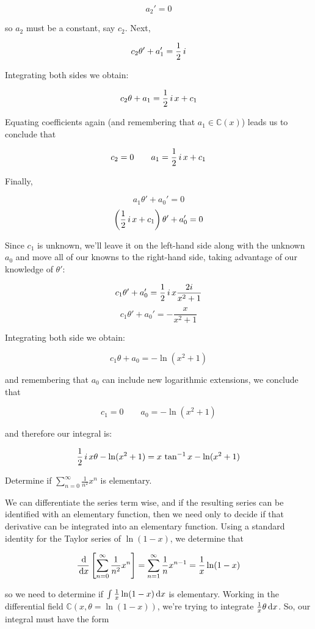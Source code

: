 $$a_2' = 0$$

so $a_2$ must be a constant, say $c_2$.  Next,

$$c_2\theta' + a_1' = {1\over2}\,i$$

Integrating both sides we obtain:

$$c_2\theta + a_1 = {1\over2}\,i\,x + c_1$$

Equating coefficients again (and remembering that
$a_1 \in {\mathbb C}(x)$) leads us to conclude that

$$c_2=0 \qquad a_1 = {1\over2}\,i\,x + c_1$$

Finally,

$$a_1\theta' + a_0' = 0$$
$$\left({1\over2}\,i\,x + c_1\right)\theta' + a_0' = 0$$

Since $c_1$ is unknown, we'll leave it on the left-hand side along
with the unknown $a_0$ and move all of our knowns to the right-hand
side, taking advantage of our knowledge of $\theta'$:

$$c_1\theta' + a_0' = {1\over2}\,i\,x \frac{2i}{x^2+1}$$
$$c_1\theta' + a_0' = - \frac{x}{x^2+1}$$

Integrating both side we obtain:

$$c_1\theta + a_0 = - \ln(x^2+1)$$

and remembering that $a_0$ can include new logarithmic extensions, we
conclude that

$$c_1 = 0 \qquad a_0 = - \ln(x^2+1)$$

and therefore our integral is:

$${1\over2}\,i\,x \theta - \ln(x^2+1) = x\,\tan^{-1} x - \ln(x^2+1)$$


\endexample

\example Determine if $\sum_{n=0}^\infty \frac{1}{n^2} x^n$ is elementary.

We can differentiate the series term wise, and if the resulting series
can be identified with an elementary function, then we need only to
decide if that derivative can be integrated into an elementary
function.  Using a standard identity for the Taylor series of $\ln
(1-x)$, we determine that

$$\frac{\,\mathrm{d}}{\,\mathrm{d} x} \left[ \sum_{n=0}^\infty \frac{1}{n^2} x^n \right] = \sum_{n=1}^\infty \frac{1}{n} x^{n-1} = \frac{1}{x}\ln (1-x)$$

so we need to determine if $\int \frac{1}{x}\ln (1-x) \,\mathrm{d} x$ is elementary.  Working in the
differential field ${\mathbb C}(x,\theta = \ln (1-x))$, we're trying to integrate
$\frac{1}{x}\theta \,\mathrm{d} x$.  So, our integral must have the form

